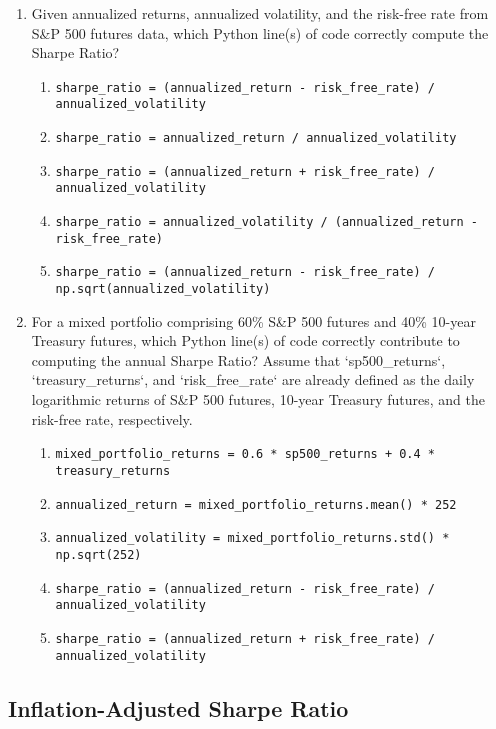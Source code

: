 \documentclass{article}
\begin{document}
\begin{enumerate}
    \item Given annualized returns, annualized volatility, and the risk-free rate from S\&P 500 futures data, which Python line(s) of code correctly compute the Sharpe Ratio?
    \begin{enumerate}
        \item \texttt{sharpe\_ratio = (annualized\_return - risk\_free\_rate) / annualized\_volatility}
        \item \texttt{sharpe\_ratio = annualized\_return / annualized\_volatility}
        \item \texttt{sharpe\_ratio = (annualized\_return + risk\_free\_rate) / annualized\_volatility}
        \item \texttt{sharpe\_ratio = annualized\_volatility / (annualized\_return - risk\_free\_rate)}
        \item \texttt{sharpe\_ratio = (annualized\_return - risk\_free\_rate) / np.sqrt(annualized\_volatility)}
    \end{enumerate}

    \item For a mixed portfolio comprising 60\% S\&P 500 futures and 40\% 10-year Treasury futures, which Python line(s) of code correctly contribute to computing the annual Sharpe Ratio? Assume that `sp500\_returns`, `treasury\_returns`, and `risk\_free\_rate` are already defined as the daily logarithmic returns of S\&P 500 futures, 10-year Treasury futures, and the risk-free rate, respectively.
    \begin{enumerate}
        \item \texttt{mixed\_portfolio\_returns = 0.6 * sp500\_returns + 0.4 * treasury\_returns}
        \item \texttt{annualized\_return = mixed\_portfolio\_returns.mean() * 252}
        \item \texttt{annualized\_volatility = mixed\_portfolio\_returns.std() * np.sqrt(252)}
        \item \texttt{sharpe\_ratio = (annualized\_return - risk\_free\_rate) / annualized\_volatility}
        \item \texttt{sharpe\_ratio = (annualized\_return + risk\_free\_rate) / annualized\_volatility}
    \end{enumerate}
\end{enumerate}

\subsection{Inflation-Adjusted Sharpe Ratio}
\end{document}
